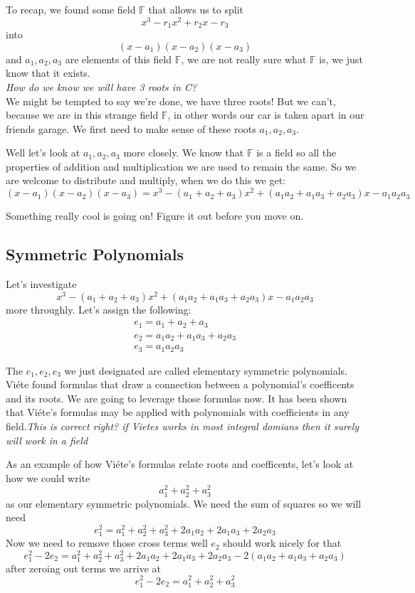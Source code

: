 \documentclass[12pt]{article}
\begin{document}


To recap, we found some field $\mathbb{F}$ that allows us to split $$x^3 -r_1 x^2 +r_2 x - r_3$$ into $$(x-a_1)(x-a_2)(x-a_3)$$ and $a_1, a_2, a_3$ are elements of this field $\mathbb{F}$, we are not really sure what $\mathbb{F}$ is, we just know that it exists.\\

{\color{red}\emph{How do we know we will have 3 roots in C?}}\\

We might be tempted to say we're done, we have three roots!  But we can't, because we are in this strange field $\mathbb{F}$, in other words our car is taken apart in our friends garage.  We first need to make sense of these roots $a_1, a_2, a_3$.


Well let's look at $a_1, a_2, a_3$ more closely.  We know that $\mathbb{F}$ is a field so all the properties of addition and multiplication we are used to remain the same.  So we are welcome to distribute and multiply, when we do this we get:
$$ (x-a_1)(x-a_2)(x-a_3) = x^3 -(a_1+a_2+a_3)x^2+(a_1a_2 +a_1a_3 +a_2a_3)x -a_1a_2a_3$$

Something really cool is going on!  Figure it out before you move on.

\subsection*{Symmetric Polynomials}
Let's investigate 
$$x^3 -(a_1+a_2+a_3)x^2+(a_1a_2 +a_1a_3 +a_2a_3)x -a_1a_2a_3$$ 
more throughly.  Let's assign the following:
\begin{align*}
e_1 = a_1 + a_2 +a_3 \\
e_2 = a_1a_2 +a_1a_3 +a_2a_3 \\
e_3 = a_1a_2a_3
\end{align*}

The $e_1, e_2, e_3$ we just designated are called elementary symmetric polynomials.  Vi\'ete found formulas that draw a connection between a polynomial's coefficents and its roots.  We are going to leverage those formulas now.  It has been shown that Vi\'ete's formulas may be applied with polynomials with coefficients in any field.{\color{red}\emph{This is correct right? if Vietes works in most integral domians then it surely will work in a field}}


As an example of how Vi\'ete's formulas relate roots and coefficents, let's look at how we could write
$$ a_1^2 + a_2^2 + a_3^2$$
as our elementary symmetric polynomials.  We need the sum of squares so we will need $$e_1^2 = a_1^2 + a_2^2 + a_3^2 + 2a_1a_2 + 2a_1a_3 + 2a_2a_3$$
Now we need to remove those cross terms well $e_2$ should work nicely for that
$$e_1^2 - 2e_2 = a_1^2 + a_2^2 + a_3^2 + 2a_1a_2 + 2a_1a_3 + 2a_2a_3 - 2(a_1a_2 +a_1a_3 +a_2a_3)$$
after zeroing out terms we arrive at
$$e_1^2 - 2e_2 = a_1^2 + a_2^2 + a_3^2$$
\end{document}
